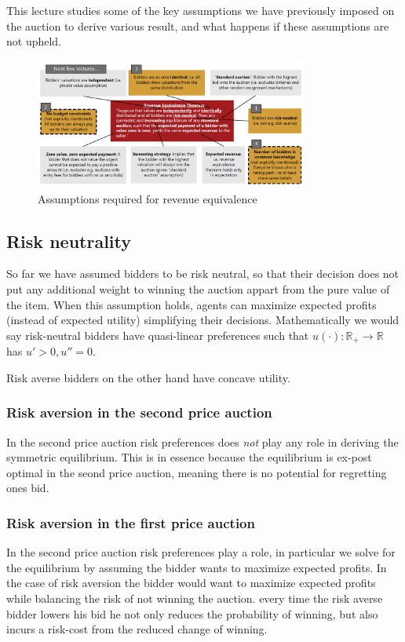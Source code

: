 This lecture studies some of the key assumptions we have previously imposed on the auction to derive various result, and what happens if these assumptions are not upheld.

\begin{figure}
  \centering
  \caption{Assumptions required for revenue equivalence}
\includegraphics[width=0.8\textwidth]{figures/assumptions.PNG}
\end{figure}

\subsection{Risk neutrality}
So far we have assumed bidders to be risk neutral, so that their decision does not put any additional weight to winning the auction appart from the pure value of the item. When this assumption holds, agents can maximize expected profits (instead of expected utility) simplifying their decisions. Mathematically we would say risk-neutral bidders have quasi-linear preferences such that $u(\cdot): \mathbb{R}_+ \rightarrow \mathbb{R}$ has $u'>0, u''=0$.

Risk averse bidders on the other hand have concave utility.

\subsubsection{Risk aversion in the second price auction}
In the second price auction risk preferences does \textit{not} play any role in deriving the symmetric equilibrium. This is in essence because the equilibrium is ex-post optimal in the seond price auction, meaning there is no potential for regretting ones bid.

\subsubsection{Risk aversion in the first price auction}
In the second price auction risk preferences play a role, in particular we solve for the equilibrium by assuming the bidder wants to maximize expected profits. In the case of risk aversion the bidder would want to maximize expected profits while balancing the risk of not winning the auction. every time the risk averse bidder lowers his bid he not only reduces the probability of winning, but also incurs a risk-cost from the reduced change of winning.


